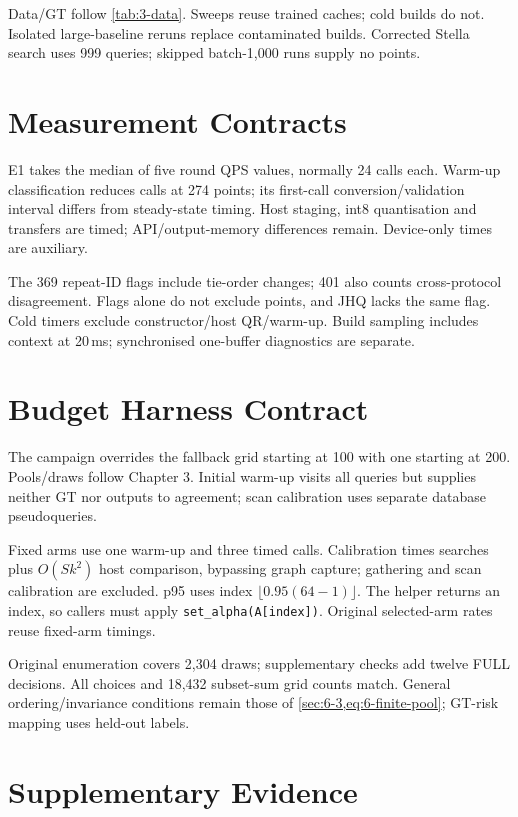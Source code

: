 Data/GT follow \cref{tab:3-data}. Sweeps reuse trained caches; cold builds do not. Isolated large-baseline reruns replace contaminated builds. Corrected Stella search uses 999 queries; skipped batch-1,000 runs supply no points.

\section{Measurement Contracts}
\label{sec:a-e1-protocol}

E1 takes the median of five round QPS values, normally 24 calls each. Warm-up classification reduces calls at 274 points; its first-call conversion/validation interval differs from steady-state timing. Host staging, int8 quantisation and transfers are timed; API/output-memory differences remain. Device-only times are auxiliary.

The 369 repeat-ID flags include tie-order changes; 401 also counts cross-protocol disagreement. Flags alone do not exclude points, and JHQ lacks the same flag. Cold timers exclude constructor/host QR/warm-up. Build sampling includes context at 20\,ms; synchronised one-buffer diagnostics are separate.

\section{Budget Harness Contract}
\label{sec:a-budget-contract}

The campaign overrides the fallback grid starting at 100 with one starting at 200. Pools/draws follow Chapter 3. Initial warm-up visits all queries but supplies neither GT nor outputs to agreement; scan calibration uses separate database pseudoqueries.

Fixed arms use one warm-up and three timed calls. Calibration times searches plus $O(Sk^2)$ host comparison, bypassing graph capture; gathering and scan calibration are excluded. p95 uses index $\lfloor0.95(64-1)\rfloor$. The helper returns an index, so callers must apply \texttt{set\_alpha(A[index])}. Original selected-arm rates reuse fixed-arm timings.

Original enumeration covers 2,304 draws; supplementary checks add twelve FULL decisions. All choices and 18,432 subset-sum grid counts match. General ordering/invariance conditions remain those of \cref{sec:6-3,eq:6-finite-pool}; GT-risk mapping uses held-out labels.

\section{Supplementary Evidence}
\label{sec:a-supplement}

